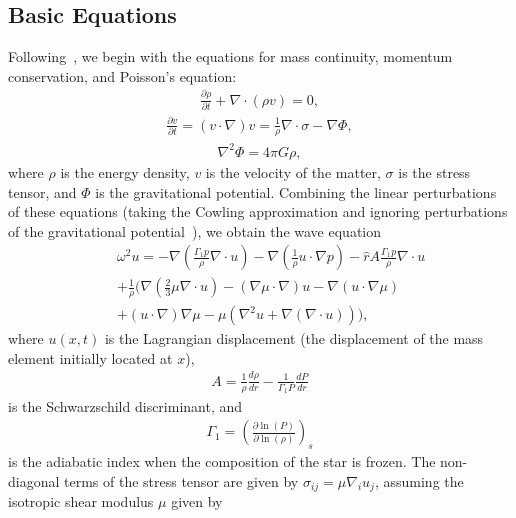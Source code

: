 \documentclass[fleqn,usenatbib]{mnras}
\begin{document}
\subsection{Basic Equations}
\hspace{\parindent}Following~\citet{mcdermott1988nonradial}, we begin with the equations for mass continuity, momentum conservation, and Poisson's equation:
\begin{align}
\frac{\partial\rho}{\partial t}+\nabla\cdot(\rho v)=0,
\label{eq:continuity_eqn}
\end{align}
\begin{align}
\frac{\partial v}{\partial t}=(v\cdot \nabla)v=\frac{1}{\rho}\nabla\cdot\sigma-\nabla\Phi,
\label{eq:momentum_eqn}
\end{align}
\begin{align}
\nabla^2\Phi=4\pi G\rho,
\label{eq:Poisson_eqn}
\end{align}
\noindent where $\rho$ is the energy density, $v$ is the velocity of the matter, $\sigma$ is the stress tensor, and $\Phi$ is the gravitational potential. Combining the linear perturbations of these equations (taking the Cowling approximation and ignoring perturbations of the gravitational potential~\citet{cowling1941non}), we obtain the wave equation
\begin{align}\nonumber
&&\omega^2u=-\nabla\left(\frac{\Gamma_1 p}{\rho}\nabla\cdot u\right)-\nabla\left(\frac{1}{\rho}u\cdot\nabla p\right)-\hat{r}A\frac{\Gamma_1 p}{\rho}\nabla\cdot u\\\nonumber
&&+\frac{1}{\rho}\biggr(\nabla\left(\frac{2}{3}\mu\nabla\cdot u\right)-\left(\nabla\mu\cdot\nabla\right)u-\nabla\left(u\cdot\nabla\mu\right)\\
&&+\left(u\cdot\nabla\right)\nabla\mu-\mu\left(\nabla^2 u+\nabla\left(\nabla\cdot u\right)\right)\biggr),
\label{eq:wave_eqn}
\end{align}
where $u(x,t)$ is the Lagrangian displacement (the displacement of the mass element initially located at $x$),
\begin{align}
A=\frac{1}{\rho}\frac{d\rho}{dr}-\frac{1}{\Gamma_1P}\frac{dP}{dr}
\label{eq:schwartz_descrim}
\end{align}
\noindent is the Schwarzschild discriminant, and
\begin{align}
\Gamma_1=\left(\frac{\partial\ln(P)}{\partial\ln(\rho)}\right)_s
\label{eq:adiabatic_index}
\end{align}
\noindent is the adiabatic index when the composition of the star is frozen. The non-diagonal terms of the stress tensor are given by $\sigma_{ij} = \mu \nabla_i u_j$, assuming the isotropic shear modulus $\mu$ given by  
\end{document}
